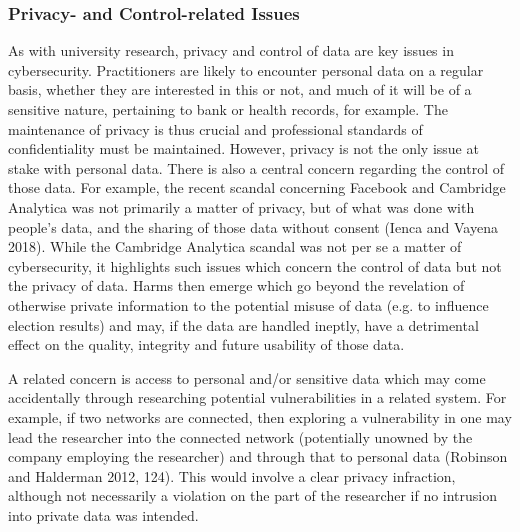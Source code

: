 \documentclass{svjour3}                     %
\begin{document}
\subsubsection{Privacy- and Control-related Issues}
As with university research, privacy and control of data are key issues in cybersecurity. Practitioners are likely to encounter personal data on a regular basis, whether they are interested in this or not, and much of it will be of a sensitive nature, pertaining to bank or health records, for example.  The maintenance of privacy is thus crucial and professional standards of confidentiality must be maintained. However, privacy is not the only issue at stake with personal data. There is also a central concern regarding the control of those data. For example, the recent scandal concerning Facebook and Cambridge Analytica was not primarily a matter of privacy, but of what was done with people’s data, and the sharing of those data without consent (Ienca and Vayena 2018). While the Cambridge Analytica scandal was not per se a matter of cybersecurity, it highlights such issues which concern the control of data but not the privacy of data. Harms then emerge which go beyond the revelation of otherwise private information to the potential misuse of data (e.g. to influence election results) and may, if the data are handled ineptly, have a detrimental effect on the quality, integrity and future usability of those data.

A related concern is access to personal and/or sensitive data which may come accidentally through researching potential vulnerabilities in a related system. For example, if two networks are connected, then exploring a vulnerability in one may lead the researcher into the connected network (potentially unowned by the company employing the researcher) and through that to personal data (Robinson and Halderman 2012, 124). This would involve a clear privacy infraction, although not necessarily a violation on the part of the researcher if no intrusion into private data was intended.
\end{document}
